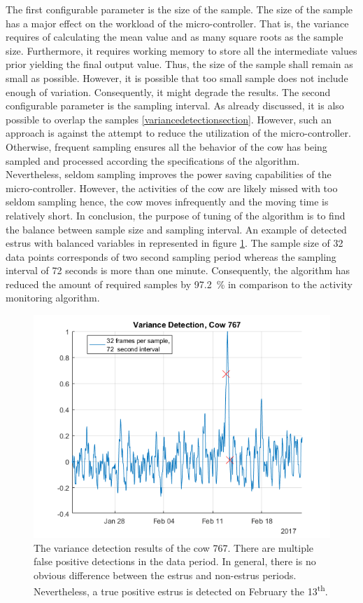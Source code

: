 \documentclass[english,12pt,a4paper,pdftex,elec,utf8]{aaltothesis}
\begin{document}
The first configurable parameter is the size of the sample. The size of the sample has a major effect on the workload of the micro-controller. That is, the variance requires of calculating the mean value and as many square roots as the sample size. Furthermore, it requires working memory to store all the intermediate values prior yielding the final output value. Thus, the size of the sample shall remain as small as possible. However, it is possible that too small sample does not include enough of variation. Consequently, it might degrade the results. The second configurable parameter is the sampling interval. As already discussed, it is also possible to overlap the samples \ref{variancedetectionsection}. However, such an approach is against the attempt to reduce the utilization of the micro-controller. Otherwise, frequent sampling ensures all the behavior of the cow has being sampled and processed according the specifications of the algorithm. Nevertheless, seldom sampling improves the power saving capabilities of the micro-controller. However, the activities of the cow are likely missed with too seldom sampling hence, the cow moves infrequently and the moving time is relatively short. In conclusion, the purpose of tuning of the algorithm is to find the balance between sample size and sampling interval. An example of detected estrus with balanced variables in represented in figure \ref{VarianceDetectionCow767}. The sample size of 32 data points corresponds of two second sampling period whereas the sampling interval of 72 seconds is more than one minute. Consequently, the algorithm has reduced the amount of required samples by \SI{97.2}{\percent} in comparison to the activity monitoring algorithm.


\begin{figure}[htb]
\centering
\includegraphics[width = 0.75 \textwidth]{figures/VarianceDetectionCow767.png}
\caption{The variance detection results of the cow 767. There are multiple false positive detections in the data period. In general, there is no obvious difference between the estrus and non-estrus periods. Nevertheless, a true positive estrus is detected on February the 13\textsuperscript{th}.}
\label{VarianceDetectionCow767}
\end{figure}
\end{document}
